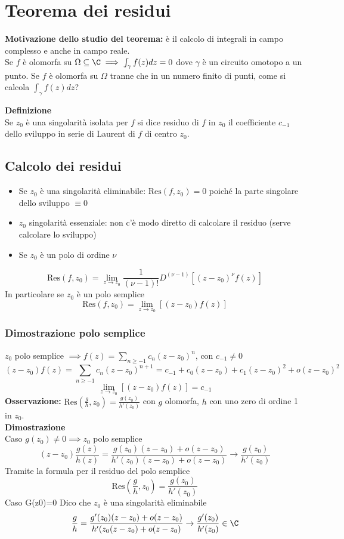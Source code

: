 

\section{Teorema dei residui}
\textbf{Motivazione dello studio del teorema: }è il calcolo di integrali in campo complesso e anche in campo reale.
\\Se $f$ è olomorfa su $\Omega \subseteq  \C \implies \int_{\gamma}^{} f(z)dz=0$ dove $\gamma$ è un circuito omotopo a un punto.
Se $f$ è olomorfa su $\Omega$ tranne che in un numero finito di punti, come si calcola $\int_{\gamma}^{} f(z)dz$?
\begin{tcolorbox}
	\textbf{Definizione}\\ 
	Se $z_0$ è una singolarità isolata per $f$ si dice residuo di $f$ in $z_0$ il coefficiente $c_{-1}$ dello sviluppo in serie di Laurent di $f$ di centro $z_0$.
\end{tcolorbox}
\subsection{Calcolo dei residui}
\begin{itemize}
	\item Se $z_0$ è una singolarità eliminabile: $\text{Res}(f,z_0)=0$ poiché la parte singolare dello sviluppo $\equiv 0$
	\item $z_0$ singolarità essenziale: non c'è modo diretto di calcolare il residuo (serve calcolare lo sviluppo)
	\item Se $z_0$ è un polo di ordine $\nu$
\end{itemize}
\[\text{Res}(f,z_0)=\lim_{z \to z_0} \frac{1}{(\nu-1)!}D^{(\nu-1)}[(z-z_0)^\nu f(z)]\]
In particolare se $z_0$ è un polo semplice
\[\text{Res}(f,z_0)=\lim_{z \to z_0} [(z-z_0)f(z)]\]
\subsubsection*{Dimostrazione polo semplice}
$z_0$ polo semplice $\implies f(z)=\sum_{n\ge -1}^{} c_n(z-z_0)^n$, con $c_{-1}\neq  0$
\[(z-z_0)f(z)=\sum_{n\ge -1}^{} c_n(z-z_0)^{n+1}=c_{-1}+c_0(z-z_0)+c_1(z-z_0)^2+o(z-z_0)^2\]
\[\lim_{z \to z_0} [(z-z_0)f(z)]=c_{-1}\]
\textbf{Osservazione:} $\text{Res}(\frac{g}{h},z_0)=\frac{g(z_0)}{h'(z_0)}$ con $g$ olomorfa, $h$ con uno zero di ordine 1 in $z_0$.\\
\textbf{Dimostrazione}\\
Caso $g(z_0)\neq 0\implies z_0$ polo semplice 
\[(z-z_0) \frac{g(z)}{h(z)}= \frac{g(z_0)(z-z_0)+o(z-z_0)}{h'(z_0)(z-z_0)+o(z-z_0)}\to  \frac{g(z_0)}{h'(z_0)}\]
Tramite la formula per il residuo del polo semplice
\[\text{Res}( \frac{g}{h},z_0)= \frac{g(z_0)}{h'(z_0)}\]
Caso G(z0)=0
Dico che $z_0$ è una singolarità eliminabile
\[\frac{g}{h}= \frac{g'(z_0)(z-z_0)+o(z-z_0)}{h'(z_0(z-z_0)+o(z-z_0)}\to \frac{g'(z_0)}{h'(z_0)}\in\C\]
